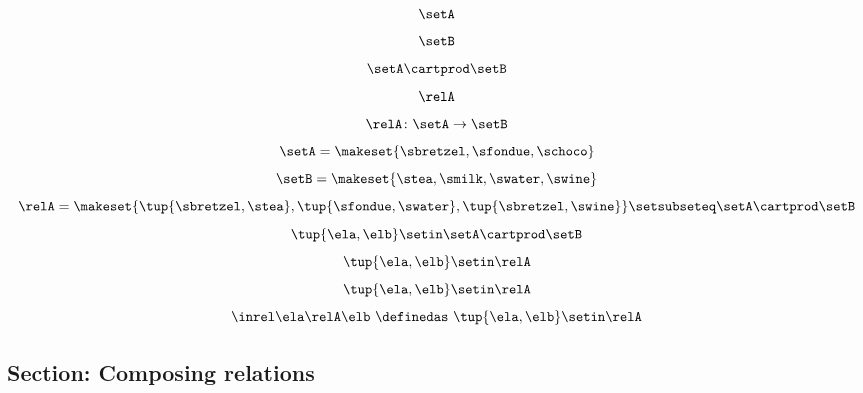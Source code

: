 \begin{forslides}
    \begin{equation}
        \label{eq:slides_session2_rel_72}
        \setA
    \end{equation}
    \begin{equation}
        \label{eq:slides_session2_rel_73}
        \setB
    \end{equation}
    \begin{equation}
        \label{eq:slides_session2_rel_74}
        \setA \cartprod \setB
    \end{equation}
    \begin{equation}
        \label{eq:slides_session2_rel_75}
        \relA
    \end{equation}
    \begin{equation}
        \label{eq:slides_session2_rel_76}
        \relA \colon \setA \to \setB
    \end{equation}
    \begin{equation}
        \label{eq:slides_session2_rel_77}
        \setA = \makeset{ \sbretzel, \sfondue, \schoco }
    \end{equation}
    \begin{equation}
        \label{eq:slides_session2_rel_78}
        \setB = \makeset{ \stea, \smilk, \swater, \swine }
    \end{equation}
    \begin{equation}
        \label{eq:slides_session2_rel_79}
        \relA = \makeset{ \tup{\sbretzel, \stea}, \tup{\sfondue, \swater}, \tup{\sbretzel, \swine} } \setsubseteq \setA \cartprod \setB
    \end{equation}
    \begin{equation}
        \label{eq:slides_session2_rel_80}
        \tup{\ela,\elb} \setin \setA \cartprod \setB
    \end{equation}
    \begin{equation}
        \label{eq:slides_session2_rel_81}
        \tup{\ela,\elb} \setin \relA
    \end{equation}
    \begin{equation}
        \label{eq:slides_session2_rel_82}
        \tup{\ela,\elb}\setin \relA
    \end{equation}
    \begin{equation}
        \label{eq:slides_session2_rel_83}
        \inrel \ela \relA \elb \ \definedas\  \tup{\ela,\elb}\setin \relA
    \end{equation}

    \subsection{Section: Composing relations}


\end{forslides}

